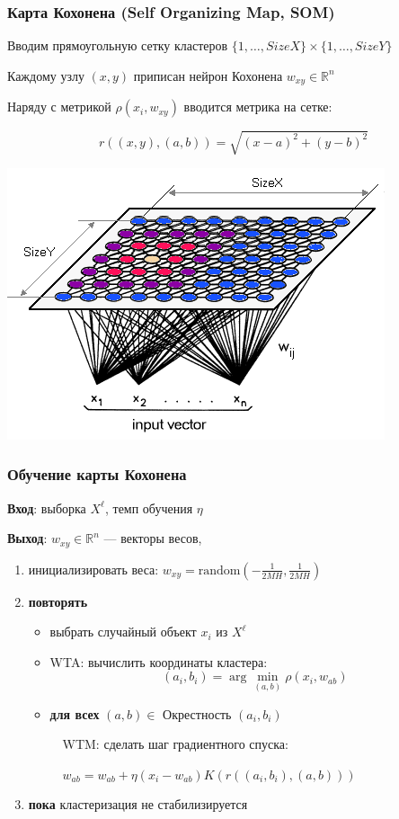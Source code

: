 \documentclass[fullscreen=true, bookmarks=true, hyperref={pdfencoding=unicode}]{beamer}
\begin{document}
\begin{frame}
  \frametitle{Карта Кохонена (Self Organizing Map, SOM)}

  Вводим прямоугольную сетку кластеров $\{1, \dots, SizeX\}\times \{1, \dots, SizeY\}$

  Каждому узлу $(x, y)$ приписан нейрон Кохонена $w_{xy} \in \mathbb{R}^n$

  Наряду с метрикой $\rho(x_i, w_{xy})$ вводится метрика на сетке:

  $$ r((x, y),(a, b)) = \sqrt{(x - a)^2 + (y - b)^2}$$

  \begin{center}
    \includegraphics[keepaspectratio,
                     width=0.5\paperwidth]{kohonen-net-scheme.png}
  \end{center}
\end{frame}

\begin{frame}
  \frametitle{Обучение карты Кохонена}

  {\bf Вход}: выборка $X^\ell$, темп обучения $\eta$

  {\bf Выход}: $w_{xy} \in \mathbb{R}^n$ — векторы весов,

  \begin{enumerate}
    \item инициализировать веса: $w_{xy} = \text{random}\left(-\frac{1}{2MH}, \frac{1}{2MH} \right)$
    \item {\bf повторять}
    \begin{itemize}
      \item выбрать случайный объект $x_i$ из $X^\ell$
      \item WTA: вычислить координаты кластера: $$(a_i, b_i) = \arg\min\limits_{(a, b)} \rho(x_i, w_{ab})$$
      \item {\bf для всех} $(a, b) \in $ Окрестность $(a_i, b_i)$

       $\ \ \ $ WTM: сделать шаг градиентного спуска:

       $\ \ \ $ $w_{ab} = w_{ab} + \eta (x_i - w_{ab}) K(r((a_i, b_i), (a, b)))$
    \end{itemize}
    \item {\bf пока} кластеризация не стабилизируется
  \end{enumerate}
\end{frame}
\end{document}
